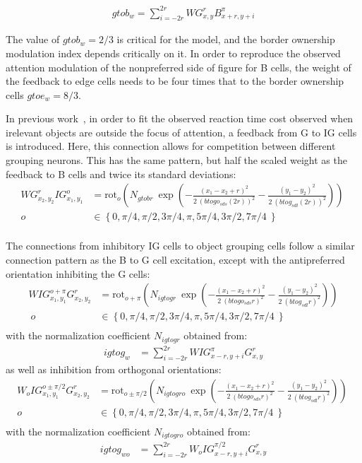 \begin{align}
	gtob_w=\sum^{2r}_{i=-2r} WG^{r}_{x,y}B^{\pi}_{x+r,y+i}
\end{align}

The value of $gtob_w=2/3$ is critical for the model, and the border ownership modulation index depends critically on it. In order to reproduce the observed attention modulation of the nonpreferred side of figure for B cells, the weight of the feedback to edge cells needs to be four times that to the border ownership cells $gtoe_w=8/3$.

In previous work~\citep{Mihalas_etal11b},
 in order to fit the observed reaction time cost observed when irelevant objects are outside the focus of attention, a feedback
from G to IG cells is introduced. Here, this connection allows for competition between different grouping neurons. This has the same pattern, but half the scaled weight as the
feedback to B cells and twice its standard deviations: 
\begin{align}
	WG^{r}_{x_2,y_2}IG^{o}_{x_1,y_1}&=\text{rot}_{o}\left(N_{gtobr}\: \exp\left(-\frac{(x_1-x_2+r)^2}{2\: (btogo_{sds} (2r))^2}
	-\frac{(y_1-y_2)^2}{2\: (btog_{sdl} (2r))^2}\right)\right) \  \nonumber\\ o&\in \left\{0,\pi/4,\pi/2,3\pi/4,\pi,5\pi/4,3\pi/2,7\pi/4\ \right\} \nonumber\\
\end{align}

The connections from inhibitory IG cells to object grouping cells follow a similar connection pattern as the B to G cell excitation, except with the antipreferred orientation inhibiting the G cells:
\begin{align}
  WIG^{o+\pi}_{x_1,y_1}G^{r}_{x_2,y_2}&=\text{rot}_{o+\pi}\left(N_{igtogr}\:
        \exp\left(-\frac{(x_1-x_2+r)^2}{2\: (btogo_{sds} r)^2}
                -\frac{(y_1-y_2)^2}{2\: (btog_{sdl} r)^2}\right)\right) \nonumber\\ \ o&\in \left\{0,\pi/4,\pi/2,3\pi/4,\pi,5\pi/4,3\pi/2,7\pi/4\ \right\} \nonumber\\
\end{align}
with the normalization coefficient $N_{igtogr}$  obtained from:
\begin{align}
	igtog_w&=\sum^{2r}_{i=-2r} WIG^{\pi}_{x-r,y+i}G^{r}_{x,y} 	
\end{align}
as well as inhibition from orthogonal orientations:
\begin{align}
	W_{o}IG^{o\pm\pi/2}_{x_1,y_1}G^{r}_{x_2,y_2}&=\text{rot}_{o\pm\pi/2}\left(N_{igtogro}\: \exp\left(-\frac{(x_1-x_2+r)^2}{2\: (btogo_{sds} r)^2}
        -\frac{(y_1-y_2)^2}{2\: (btog_{sdl} r)^2}\right)\right)\ \nonumber\\ o&\in
        \left\{0,\pi/4,\pi/2,3\pi/4,\pi,5\pi/4,3\pi/2,7\pi/4\ \right\} \nonumber\\ 
\end{align}
with the normalization coefficient $N_{igtogro}$ obtained from:
\begin{align}
	igtog_{wo}&=\sum^{2r}_{i=-2r} W_{o}IG^{\pi/2}_{x-r,y+i}G^{r}_{x,y} 	
\end{align}


